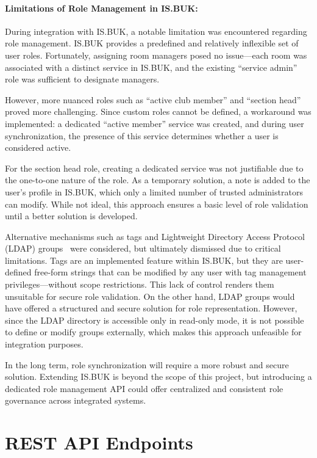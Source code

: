 \paragraph{Limitations of Role Management in IS.BUK:}

During integration with IS.BUK, a notable limitation was encountered regarding role management. IS.BUK provides a predefined and relatively inflexible set of user roles. Fortunately, assigning room managers posed no issue—each room was associated with a distinct service in IS.BUK, and the existing “service admin” role was sufficient to designate managers.

\newpage
However, more nuanced roles such as “active club member” and “section head” proved more challenging. Since custom roles cannot be defined, a workaround was implemented: a dedicated “active member” service was created, and during user synchronization, the presence of this service determines whether a user is considered active.

For the section head role, creating a dedicated service was not justifiable due to the one-to-one nature of the role. As a temporary solution, a note is added to the user’s profile in IS.BUK, which only a limited number of trusted administrators can modify. While not ideal, this approach ensures a basic level of role validation until a better solution is developed.

Alternative mechanisms such as tags and Lightweight Directory Access Protocol (LDAP) groups~\cite{LDAP} were considered, but ultimately dismissed due to critical limitations. Tags are an implemented feature within IS.BUK, but they are user-defined free-form strings that can be modified by any user with tag management privileges—without scope restrictions. This lack of control renders them unsuitable for secure role validation. On the other hand, LDAP groups would have offered a structured and secure solution for role representation. However, since the LDAP directory is accessible only in read-only mode, it is not possible to define or modify groups externally, which makes this approach unfeasible for integration purposes.

In the long term, role synchronization will require a more robust and secure solution. Extending IS.BUK is beyond the scope of this project, but introducing a dedicated role management API could offer centralized and consistent role governance across integrated systems.

\section{REST API Endpoints}

